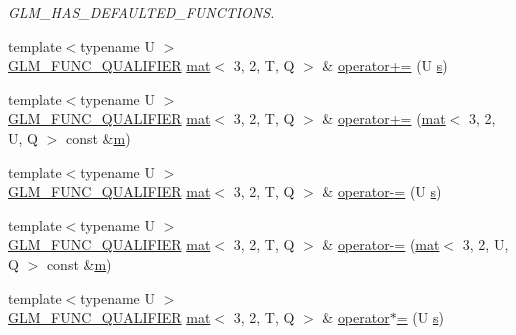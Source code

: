 \begin{DoxyCompactItemize}
\begin{DoxyCompactList}\small\item\em G\+L\+M\+\_\+\+H\+A\+S\+\_\+\+D\+E\+F\+A\+U\+L\+T\+E\+D\+\_\+\+F\+U\+N\+C\+T\+I\+O\+NS. \end{DoxyCompactList}\item 
{\footnotesize template$<$typename U $>$ }\\\mbox{\hyperlink{setup_8hpp_a33fdea6f91c5f834105f7415e2a64407}{G\+L\+M\+\_\+\+F\+U\+N\+C\+\_\+\+Q\+U\+A\+L\+I\+F\+I\+ER}} \mbox{\hyperlink{structglm_1_1mat}{mat}}$<$ 3, 2, T, Q $>$ \& \mbox{\hyperlink{structglm_1_1mat_3_013_00_012_00_01_t_00_01_q_01_4_aa7657886e5ae9f21e9c2c5612d8b174f}{operator+=}} (U \mbox{\hyperlink{_s_d_l__opengl_8h_a4af680a6c683f88ed67b76f207f2e6e4}{s}})
\item 
{\footnotesize template$<$typename U $>$ }\\\mbox{\hyperlink{setup_8hpp_a33fdea6f91c5f834105f7415e2a64407}{G\+L\+M\+\_\+\+F\+U\+N\+C\+\_\+\+Q\+U\+A\+L\+I\+F\+I\+ER}} \mbox{\hyperlink{structglm_1_1mat}{mat}}$<$ 3, 2, T, Q $>$ \& \mbox{\hyperlink{structglm_1_1mat_3_013_00_012_00_01_t_00_01_q_01_4_a5deb395c257fbf8d8ba3dc745fa85f44}{operator+=}} (\mbox{\hyperlink{structglm_1_1mat}{mat}}$<$ 3, 2, U, Q $>$ const \&\mbox{\hyperlink{_s_d_l__opengl__glext_8h_af593500c283bf1a787a6f947f503a5c2}{m}})
\item 
{\footnotesize template$<$typename U $>$ }\\\mbox{\hyperlink{setup_8hpp_a33fdea6f91c5f834105f7415e2a64407}{G\+L\+M\+\_\+\+F\+U\+N\+C\+\_\+\+Q\+U\+A\+L\+I\+F\+I\+ER}} \mbox{\hyperlink{structglm_1_1mat}{mat}}$<$ 3, 2, T, Q $>$ \& \mbox{\hyperlink{structglm_1_1mat_3_013_00_012_00_01_t_00_01_q_01_4_a51cfb6b2048caf1fd49086f4f4d9ddb1}{operator-\/=}} (U \mbox{\hyperlink{_s_d_l__opengl_8h_a4af680a6c683f88ed67b76f207f2e6e4}{s}})
\item 
{\footnotesize template$<$typename U $>$ }\\\mbox{\hyperlink{setup_8hpp_a33fdea6f91c5f834105f7415e2a64407}{G\+L\+M\+\_\+\+F\+U\+N\+C\+\_\+\+Q\+U\+A\+L\+I\+F\+I\+ER}} \mbox{\hyperlink{structglm_1_1mat}{mat}}$<$ 3, 2, T, Q $>$ \& \mbox{\hyperlink{structglm_1_1mat_3_013_00_012_00_01_t_00_01_q_01_4_a2145949a0575fb0b25217ea8d251da3c}{operator-\/=}} (\mbox{\hyperlink{structglm_1_1mat}{mat}}$<$ 3, 2, U, Q $>$ const \&\mbox{\hyperlink{_s_d_l__opengl__glext_8h_af593500c283bf1a787a6f947f503a5c2}{m}})
\item 
{\footnotesize template$<$typename U $>$ }\\\mbox{\hyperlink{setup_8hpp_a33fdea6f91c5f834105f7415e2a64407}{G\+L\+M\+\_\+\+F\+U\+N\+C\+\_\+\+Q\+U\+A\+L\+I\+F\+I\+ER}} \mbox{\hyperlink{structglm_1_1mat}{mat}}$<$ 3, 2, T, Q $>$ \& \mbox{\hyperlink{structglm_1_1mat_3_013_00_012_00_01_t_00_01_q_01_4_af9e97ef690502d8ee8bf7f6d7ec91c9c}{operator$\ast$=}} (U \mbox{\hyperlink{_s_d_l__opengl_8h_a4af680a6c683f88ed67b76f207f2e6e4}{s}})

\end{DoxyCompactItemize}
